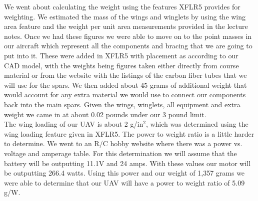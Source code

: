 We went about calculating the weight using the features XFLR5 provides for weighting. We estimated the mass of the wings and winglets by using the wing area feature and the weight per unit area measurements provided in the lecture notes. Once we had these figures we were able to move on to the point masses in our aircraft which represent all the components and bracing that we are going to put into it. These were added in XFLR5 with placement as according to our CAD model, with the weights being figures taken either directly from course material or from the website with the listings of the carbon fiber tubes that we will use for the spars. We then added about 45 grams of additional weight that would account for any extra material we would use to connect our components back into the main spars. Given the wings, winglets, all equipment and extra weight we came in at about 0.02 pounds under our 3 pound limit. \\

The wing loading of our UAV is about 2 g/in$^2$, which was determined using the wing loading feature given in XFLR5. The power to weight ratio is a little harder to determine. We went to an R/C hobby website where there was a power vs. voltage and amperage table. For this determination we will assume that the battery will be outputting 11.1V and 24 amps. With these values our motor will be outputting 266.4 watts. Using this power and our weight of 1,357 grams we were able to determine that our UAV will have a power to weight ratio of 5.09 g/W.



